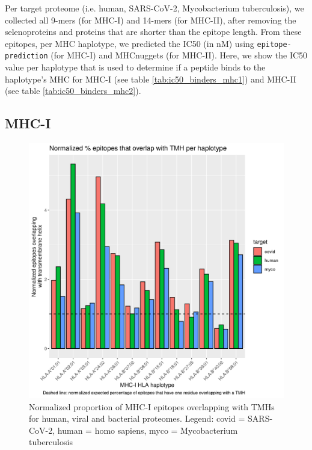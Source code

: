 Per target proteome (i.e. human, SARS-CoV-2, Mycobacterium tuberculosis),
we collected all 9-mers (for MHC-I) and 14-mers (for MHC-II),
after removing the selenoproteins and proteins that are shorter
than the epitope length.
From these epitopes, per MHC haplotype,
we predicted the IC50 (in nM) using \verb;epitope-prediction; (for MHC-I)
and MHCnuggets (for MHC-II). 
Here, we show the IC50 value per haplotype that
is used to determine if a peptide binds to the haplotype's MHC
for MHC-I (see table \ref{tab:ic50_binders_mhc1}) and 
MHC-II (see table \ref{tab:ic50_binders_mhc2}).





\subsection{MHC-I}

\begin{figure}[!htbp]
  \includegraphics[width=\textwidth]{bbbq_1_smart_results/fig_f_tmh_mhc1_2_normalized.png}
  \caption{
    Normalized proportion of MHC-I epitopes overlapping with TMHs
    for human, viral and bacterial proteomes.
    Legend: covid = SARS-CoV-2,
    human = homo sapiens, myco = Mycobacterium tuberculosis
  }
  \label{fig:f_tmh_mhc1_normalized}
\end{figure}

